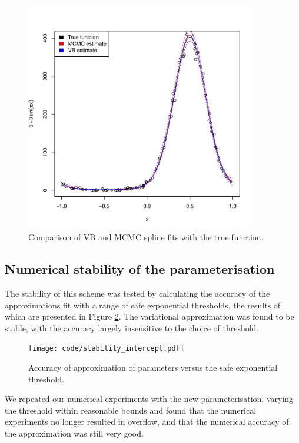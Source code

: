 \begin{figure}[h]

	\includegraphics[width=  0.9\textwidth]{code/results/accuracy_plots_spline_gva2.pdf}
	
	\label{fig:spline}  
\caption{Comparison of VB and MCMC spline fits with the true function.}	
\end{figure}

  
		
\subsection{Numerical stability of the parameterisation}

The stability of this scheme was tested by calculating the accuracy of the
approximations fit with a range of safe exponential thresholds, the results of
which are presented in Figure \ref{fig:stability_accuracy}. The variational
approximation was found to be stable, with the accuracy largely insensitive to
the choice of threshold.

\begin{figure}[h]
	\texttt{[image: code/stability\_intercept.pdf]}
	\label{fig:stability_accuracy}
	\caption{Accuracy of approximation of parameters versus the safe exponential threshold.}
\end{figure}

We repeated our numerical experiments with the new parameterisation, varying
the threshold within reasonable bounds and found that the numerical experiments
no longer resulted in overflow, and that the numerical accuracy of the
approximation was still very good.

